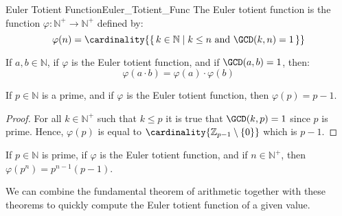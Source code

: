 \documentclass{article}                                                        %
\begin{document}
            \begin{fdefinition}{Euler Totient Function}{Euler_Totient_Func}
                The Euler totient function is the function
                $\varphi:\mathbb{N}^{+}\rightarrow\mathbb{N}^{+}$ defined by:
                \begin{equation*}
                    \varphi(n)=\cardinality{%
                        \{\,k\in\mathbb{N}\;|\;
                        k\leq{n}\textrm{ and }\GCD(k,n)=1\,\}%
                    }
                \end{equation*}
            \end{fdefinition}
            \begin{theorem}
                \label{thm:Euler_Totient_Multiplicative}%
                If $a,b\in\mathbb{N}$, if $\varphi$ is the Euler totient function,
                and if $\GCD(a,b)=1$, then:
                \begin{equation}
                    \varphi(a\cdot{b})=\varphi(a)\cdot\varphi(b)
                \end{equation}
            \end{theorem}
            \begin{theorem}
                \label{thm:Euler_Totient_of_Prime}%
                If $p\in\mathbb{N}$ is a prime, and if $\varphi$ is the Euler
                totient function, then $\varphi(p)=p-1$.
            \end{theorem}
            \begin{proof}
                For all $k\in\mathbb{N}^{+}$ such that $k\leq{p}$ it is true that
                $\GCD(k,p)=1$ since $p$ is prime. Hence, $\varphi(p)$ is equal to
                $\cardinality{\mathbb{Z}_{p-1}\setminus\{0\}}$ which is $p-1$.
            \end{proof}
            \begin{theorem}
                \label{thm:Euler_Totient_Powers_of_Primes}%
                If $p\in\mathbb{N}$ is prime, if $\varphi$ is the Euler totient
                function, and if $n\in\mathbb{N}^{+}$, then
                $\varphi(p^{n})=p^{n-1}(p-1)$.
            \end{theorem}
            We can combine the fundamental theorem of arithmetic together with these
            theorems to quickly compute the Euler totient function of a given value.
\end{document}
